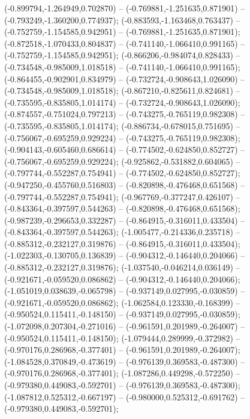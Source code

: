 (-0.899794,-1.264949,0.702870) -- (-0.769881,-1.251635,0.871901) -- (-0.793249,-1.360200,0.774937);
 (-0.883593,-1.163468,0.763437) -- (-0.752759,-1.154585,0.942951) -- (-0.769881,-1.251635,0.871901);
 (-0.872518,-1.070433,0.804837) -- (-0.741140,-1.066410,0.991165) -- (-0.752759,-1.154585,0.942951);
 (-0.866206,-0.984074,0.828433) -- (-0.734548,-0.985009,1.018518) -- (-0.741140,-1.066410,0.991165);
 (-0.864455,-0.902901,0.834979) -- (-0.732724,-0.908643,1.026090) -- (-0.734548,-0.985009,1.018518);
 (-0.867210,-0.825611,0.824681) -- (-0.735595,-0.835805,1.014174) -- (-0.732724,-0.908643,1.026090);
 (-0.874557,-0.751024,0.797213) -- (-0.743275,-0.765119,0.982308) -- (-0.735595,-0.835805,1.014174);
 (-0.886734,-0.678015,0.751695) -- (-0.756067,-0.695259,0.929224) -- (-0.743275,-0.765119,0.982308);
 (-0.904143,-0.605460,0.686614) -- (-0.774502,-0.624850,0.852727) -- (-0.756067,-0.695259,0.929224);
 (-0.925862,-0.531882,0.604065) -- (-0.797744,-0.552287,0.754941) -- (-0.774502,-0.624850,0.852727);
 (-0.947250,-0.455760,0.516803) -- (-0.820898,-0.476468,0.651568) -- (-0.797744,-0.552287,0.754941);
 (-0.967769,-0.377247,0.426107) -- (-0.843364,-0.397597,0.544263) -- (-0.820898,-0.476468,0.651568);
 (-0.987239,-0.296653,0.332287) -- (-0.864915,-0.316011,0.433504) -- (-0.843364,-0.397597,0.544263);
 (-1.005477,-0.214336,0.235718) -- (-0.885312,-0.232127,0.319876) -- (-0.864915,-0.316011,0.433504);
 (-1.022303,-0.130705,0.136839) -- (-0.904312,-0.146440,0.204066) -- (-0.885312,-0.232127,0.319876);
 (-1.037540,-0.046214,0.036149) -- (-0.921671,-0.059520,0.086862) -- (-0.904312,-0.146440,0.204066);
 (-1.051019,0.038639,-0.065798) -- (-0.937149,0.027995,-0.030859) -- (-0.921671,-0.059520,0.086862);
 (-1.062584,0.123330,-0.168399) -- (-0.950524,0.115411,-0.148150) -- (-0.937149,0.027995,-0.030859);
 (-1.072098,0.207304,-0.271016) -- (-0.961591,0.201989,-0.264007) -- (-0.950524,0.115411,-0.148150);
 (-1.079444,0.289999,-0.372982) -- (-0.970176,0.286968,-0.377401) -- (-0.961591,0.201989,-0.264007);
 (-1.084528,0.370849,-0.473619) -- (-0.976139,0.369583,-0.487300) -- (-0.970176,0.286968,-0.377401);
 (-1.087286,0.449298,-0.572250) -- (-0.979380,0.449083,-0.592701) -- (-0.976139,0.369583,-0.487300);
 (-1.087812,0.525312,-0.667197) -- (-0.980000,0.525312,-0.691762) -- (-0.979380,0.449083,-0.592701);
